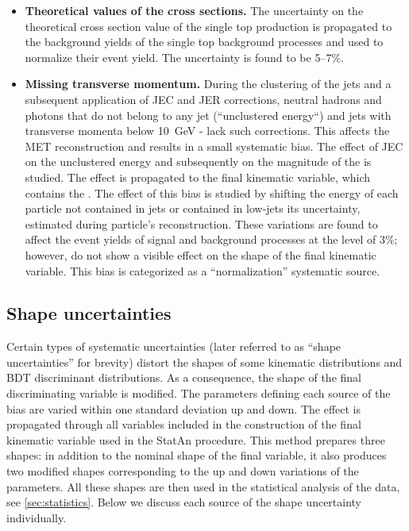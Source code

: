 \begin{small}
\begin{itemize}
\item{\bf Theoretical values of the cross sections.} 
The uncertainty on the theoretical cross section value of the single top production is propagated to the background yields of the single top background processes and used to normalize their event yield. The uncertainty is found to be 5--7\%. 

\item{\bf Missing transverse momentum.} 
During the clustering of the jets and a subsequent application of JEC and JER corrections, 
neutral hadrons and photons that do not belong to any jet (``unclustered energy``) and jets with transverse momenta below 10~GeV - lack such corrections. This affects the MET reconstruction and results in a small systematic bias. The effect of JEC on the unclustered energy and subsequently on the magnitude of the \PTslash is studied. The effect is propagated to the final kinematic variable, which contains the \PTslash. The effect of this bias is studied by shifting the energy of each particle not contained in jets or contained in low-\pt jets its uncertainty, estimated during particle's reconstruction. These variations are found to affect the event yields of signal and background processes at the level of 3\%; however, do not show a visible effect on the shape of the final kinematic variable. This bias is categorized as a ``normalization'' systematic source.

\end{itemize}

\subsection{Shape uncertainties}
\label{sec:shapes}

Certain types of systematic uncertainties (later referred to as ``shape uncertainties'' for brevity) distort the shapes of some 
kinematic distributions and BDT discriminant distributions. As a consequence, the shape of the final discriminating variable is modified. The parameters defining each source of the bias are varied within one standard deviation up and down. The effect is propagated through all variables included in the construction of the final kinematic variable used in the StatAn procedure. This method prepares three shapes: in addition to the nominal shape of the final variable, it also produces two modified shapes corresponding to the up and down variations of the parameters. All these shapes are then used in the statistical analysis of the data, see \ref{sec:statistics}. Below we discuss each source of the shape uncertainty individually.


\end{small}
